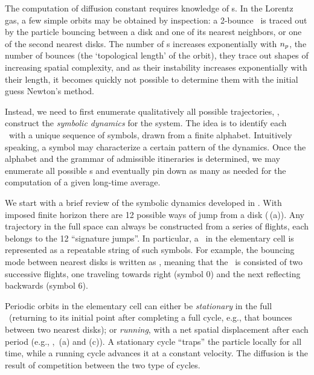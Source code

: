 


The computation of diffusion constant  requires
knowledge of \po s. In the Lorentz gas, a few simple orbits may be
obtained by inspection: a 2-bounce \po\ is traced out by the particle
bouncing between a disk and one of its nearest neighbors, or one of the
second nearest disks. The number of \po s increases exponentially with
${n_{p}}$, the number of bounces (the `topological length' of the
orbit), they trace out shapes of increasing spatial complexity, and as
their instability increases exponentially with their length, it
becomes quickly not possible to determine them with the initial guess
Newton's method.

Instead, we need to first enumerate qualitatively all possible
trajectories, \ie, construct the \emph{symbolic dynamics} for the system.
The idea is to identify each \po\ with a unique sequence of symbols,
drawn from a finite alphabet. Intuitively speaking, a symbol may
characterize a certain pattern of the dynamics. Once the alphabet and the
grammar of admissible itineraries is determined, we may enumerate all
possible \po s and eventually pin down as many as needed for the
computation of a given long-time average.

We start with a brief review of the symbolic dynamics developed in
. With imposed finite horizon there are 12 possible ways of
jump from a disk (\,(a)). Any trajectory
in the full space can always be constructed from a series of flights,
each belongs to the 12 ``signature jumps''. In particular, a \po\ in the
elementary cell is represented as a repeatable string of such symbols.
For example, the bouncing mode between nearest disks is written as
, meaning that the \po\ is consisted of two successive flights,
one traveling towards right (symbol $0$) and the
next reflecting backwards (symbol $6$).

Periodic orbits in the elementary cell can either be \emph{stationary} in
the full \statesp\ (returning to its initial point after completing a
full cycle, e.g.,  that bounces between two nearest disks); or
\emph{running}, with a net spatial displacement after each period (e.g.,
, \,(a) and (c)). A stationary
cycle ``traps'' the  particle locally for all time, while a running cycle
advances it at a constant  velocity. The diffusion  is
the result of competition between the two type of cycles.

